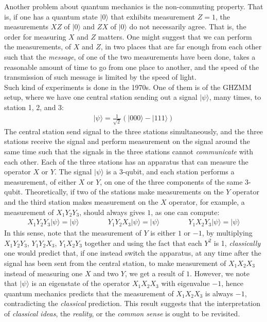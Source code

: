\documentclass[11pt]{book}
\theoremstyle{break}
\theoremstyle{break}
\begin{document}
Another problem about quantum mechanics is the non-commuting property. That is, if one has a quantum state $|0\rangle$ that exhibits measurement $Z = 1$, the measurements $XZ$ of $|0\rangle$ and $ZX$ of $|0\rangle$ do not necessarily agree. That is, the order for measuring $X$ and $Z$ matters. One might suggest that we can perform the measurements, of $X$ and $Z$, in two places that are far enough from each other such that the \textit{message}, of one of the two measurements have been done, takes a reasonable amount of time to go from one place to another, and the speed of the transmission of such message is limited by the speed of light.\\ 

Such kind of experiments is done in the 1970s. One of them is of the GHZMM setup, where we have one central station sending out a signal $|\psi\rangle$, many times, to station 1, 2, and 3:
\begin{align*}
|\psi\rangle = \frac{1}{\sqrt{2}}\left( |000\rangle - |111\rangle\right)
\end{align*}
The central station send signal to the three stations simultaneously, and the three stations receive the signal and perform measurement on the signal around the same time such that the signals in the three stations cannot \textit{communicate} with each other. Each of the three stations has an apparatus that can measure the operator $X$ or $Y$. The signal $|\psi\rangle$ is a $3$-qubit, and each station performs a measurement, of either $X$ or $Y$, on one of the three components of the same $3$-qubit. Theoretically, if two of the stations make measurements on the $Y$ operator and the third station makes measurement on the $X$ operator, for example, a measurement of $X_1Y_2Y_3$, should always gives $1$, as one can compute:
\begin{align*}
X_1Y_2Y_3 |\psi\rangle = |\psi\rangle \qquad\qquad Y_1Y_2X_3|\psi\rangle = |\psi\rangle \qquad\qquad Y_1X_2Y_3|\psi\rangle = |\psi\rangle 
\end{align*}
In this sense, note that the measurement of $Y$ is either $1$ or $-1$, by  multiplying $X_1Y_2Y_3$, $Y_1Y_2X_3$, $Y_1X_2Y_3$ together and using the fact that each $Y^2$ is 1, \textit{classically} one would predict that, if one instead switch the apparatus, at any time after the signal has been sent from the central station, to make measurement of $X_1X_2X_3$ instead of measuring one $X$ and two $Y$, we get a result of $1$. However, we note that $|\psi\rangle$ is an eigenstate of the operator $X_1X_2X_3$ with eigenvalue $-1$, hence quantum mechanics predicts that the measurement of $X_1X_2X_3$ is always $-1$, contradicting the \textit{classical} prediction. This result suggests that the interpretation of \textit{classical ideas}, the \textit{reality}, or the \textit{common sense} is ought to be revisited.  
\end{document}
